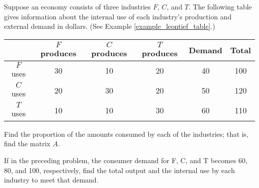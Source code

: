 \begin{puzzle}
    Suppose an economy consists of three industries \( F \), \( C \), and \( T \). The following table gives information about the internal use of each industry’s production and external demand in dollars. (See Example \ref{example_leontief_table}.)

    \begin{center}
        \begin{tabular}{|c|c|c|c|c|c|}
            \hline
                         & \( F \) produces & \( C \) produces & \( T \) produces & Demand & Total \\
            \hline
            \( F \) uses & 30               & 10               & 20               & 40     & 100   \\
            \( C \) uses & 20               & 30               & 20               & 50     & 120   \\
            \( T \) uses & 10               & 10               & 30               & 60     & 110   \\
            \hline
        \end{tabular}
    \end{center}

    Find the proportion of the amounts consumed by each of the industries; that is, find the matrix \( A \).
\end{puzzle}


\begin{puzzle}
    If in the preceding problem, the consumer demand for F, C, and T becomes 60, 80, and 100,
    respectively, find the total output and the internal use by each industry to meet that demand.

\end{puzzle}